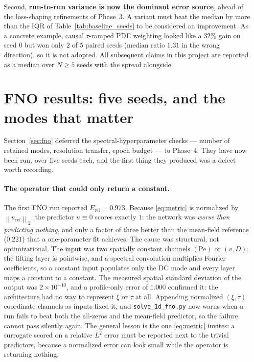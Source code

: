 \documentclass[11pt]{article}
\newcommand{\norm}[1]{\left\lVert #1 \right\rVert}
\begin{document}
Second, \textbf{run-to-run variance is now the dominant error source}, ahead of
the loss-shaping refinements of Phase~3. A variant must beat the median by more
than the IQR of
Table~\ref{tab:baseline_seeds} to be considered an improvement. As a concrete
example, causal $\tau$-ramped PDE weighting looked like a $32\%$ gain on seed
$0$ but won only $2$ of $5$ paired seeds (median ratio $1.31$ in the wrong
direction), so it is not adopted. All subsequent claims in this project are
reported as a median over $N\geq5$ seeds with the spread alongside.

\section{FNO results: five seeds, and the modes that matter}
\label{sec:fno-results}

Section~\ref{sec:fno} deferred the spectral-hyperparameter checks --- number of
retained modes, resolution transfer, epoch budget --- to Phase~4. They have now
been run, over five seeds each, and the first thing they produced was a defect
worth recording.

\paragraph{The operator that could only return a constant.}
The first FNO run reported $E_{\mathrm{rel}}=0.973$. Because
\eqref{eq:metric} is normalized by $\norm{u_{\mathrm{ref}}}_{2}$, the predictor
$u\equiv 0$ scores exactly $1$: the network was \emph{worse than predicting
nothing}, and only a factor of three better than the mean-field reference
($0.221$) that a one-parameter fit achieves. The cause was structural, not
optimizational. The input was two spatially constant channels $(\mathrm{Pe})$
or $(v,D)$; the lifting layer is pointwise, and a spectral convolution
multiplies Fourier coefficients, so a constant input populates only the DC mode
and every layer maps a constant to a constant. The measured spatial standard
deviation of the output was $2\times10^{-10}$, and a profile-only error of
$1.000$ confirmed it: the architecture had no way to represent $\xi$ or $\tau$
at all. Appending normalized $(\xi,\tau)$ coordinate channels as inputs fixed
it, and \texttt{solve\_1d\_fno.py} now warns when a run fails to beat both the
all-zeros and the mean-field predictor, so the failure cannot pass silently
again. The general lesson is the one \eqref{eq:metric} invites: a surrogate
scored on a relative $L^{2}$ error must be reported next to the trivial
predictors, because a normalized error can look small while the operator is
returning nothing.
\end{document}
